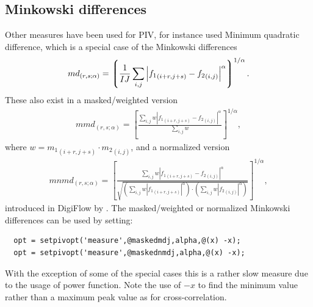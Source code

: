 \documentclass[10pt]{article}
\newcommand{\FT}{\ensuremath{\mathcal F}}
\newcommand{\iFT}{\ensuremath{\mathcal F^{-1}}}
\begin{document}
% 
% 
%   
\subsection{Minkowski differences}
Other measures have been used for PIV, for instance \cite{Gui1998} used  Minimum quadratic difference, which is a special case of the Minkowski differences 
   \begin{align*}
		md_{(r,s;\alpha)} = \left\lgroup\frac{1}{IJ}\sum_{i,j} \left|{f_1}_{(i+r,j+s)}-{f_2}_{(i,j)}\right|^\alpha\right\rgroup^{1/\alpha}.
   \end{align*} 
These also exist in a masked/weighted version
\begin{align*}
		mmd_{(r,s;\alpha)} = \left[\frac{\sum_{i,j} w\left|{f_1}_{(i+r,j+s)}-{f_2}_{(i,j)}\right|^\alpha}
		{ \sum_{i,j} w}\right]^{1/\alpha},
\end{align*}
where  $w = {m_1}_{(i+r,j+s)}\cdot {m_2}_{(i,j)}$, 
and a normalized version 
\begin{align*}
		mnmd_{(r,s;\alpha)} = \left[\frac{\sum_{i,j} w\left|{f_1}_{(i+r,j+s)}-{f_2}_{(i,j)}\right|^\alpha}
		{ \sqrt{\left(\sum_{i,j} w\left|{f_1}_{(i+r,j+s)}\right|^\alpha\right)\cdot\left(\sum_{i,j} w\left|{f_2}_{(i,j)}\right|^\alpha\right)}}\right]^{1/\alpha},
\end{align*}
introduced in DigiFlow by \cite{Dalziel2012}. 
%
The masked/weighted or normalized Minkowski differences can be used by setting:
\begin{lstlisting}
  opt = setpivopt('measure',@maskedmdj,alpha,@(x) -x);
  opt = setpivopt('measure',@maskednmdj,alpha,@(x) -x);
\end{lstlisting}
With the exception of some of the special cases this is a rather slow measure due to the usage of power function.
Note the use of $-x$ to find the minimum value rather than a maximum peak value as for cross-correlation.


\end{document}
